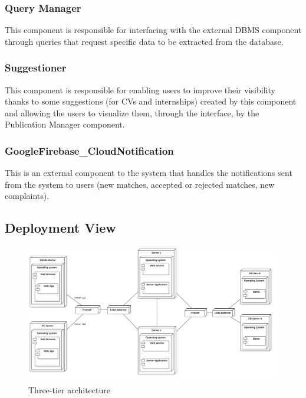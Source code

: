 \documentclass{article}
\begin{document}
\subsubsection{Query Manager}
This component is responsible for interfacing with the external DBMS component through queries that request specific data to be extracted from the database. 

\subsubsection{Suggestioner}
This component is responsible for enabling users to improve their visibility thanks to some suggestions (for CVs and internships) created by this component and allowing the users to visualize them, through the interface, by the Publication Manager component.

\subsubsection{GoogleFirebase\_CloudNotification}
This is an external component to the system that handles the notifications sent from the system to users (new matches, accepted or rejected matches, new complaints). 

\subsection{Deployment View}
\begin{figure}[H]
    \centering
    \includegraphics[width=1\linewidth]{DeploymentDiagram.jpg}
    \caption{Three-tier architecture}
    \label{fig:enter-label}
\end{figure}
\end{document}

